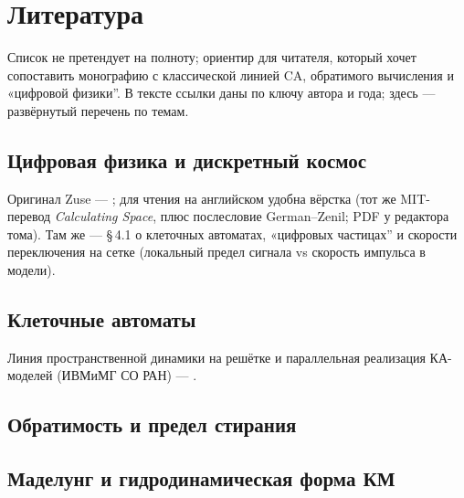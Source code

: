 \chapter{Литература}
\label{ch:literature}

Список не претендует на полноту; ориентир для читателя, который хочет сопоставить монографию с классической линией CA, обратимого вычисления и «цифровой физики''.
В тексте ссылки даны по ключу автора и года; здесь --- развёрнутый перечень по темам.

\section{Цифровая физика и дискретный космос}
\noindent
Оригинал Zuse --- \textcite{zuse1969}; для чтения на английском удобна вёрстка \textcite{zuse2012zenil}
(тот же MIT-перевод \emph{Calculating Space}, плюс послесловие German--Zenil; PDF у редактора тома).
Там же --- §\,4.1 о клеточных автоматах, «цифровых частицах'' и скорости переключения на сетке
(локальный предел сигнала vs скорость импульса в модели).
\begin{refsection}
\nocite{zuse1967,zuse1969,zuse2012zenil,fredkin1990,feynman1982,mainzer2011,tHooft2016}
\printbibliography[heading=none]
\end{refsection}

\section{Клеточные автоматы}
\noindent
Линия пространственной динамики на решётке и параллельная реализация КА-моделей
(ИВМиМГ СО РАН) --- \textcite{bandman2006,bandman2001}.
\begin{refsection}
\nocite{vonneumann1966,gardner1970,cook2004,wolfram1984,wolfram2002,vichniac1984,omohundro1984,langton1986,toffoli1987,bandman2006,bandman2001}
\printbibliography[heading=none]
\end{refsection}

\section{Обратимость и предел стирания}
\begin{refsection}
\nocite{bennett1973,landauer1961,toffoli1982}
\printbibliography[heading=none]
\end{refsection}

\section{Маделунг и гидродинамическая форма КМ}
\begin{refsection}
\nocite{madelung1927}
\printbibliography[heading=none]
\end{refsection}
